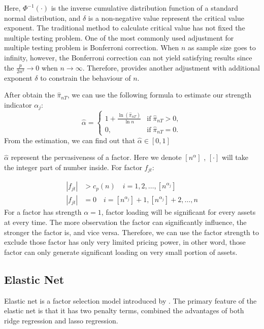 \documentclass[12pt]{article}
\begin{document}
Here, $\Phi^{-1}(\cdot)$ is the inverse cumulative distribution function of a standard normal distribution, and $\delta$ is a non-negative value represent the critical value exponent. 
The traditional method to calculate critical value has not fixed the multiple testing problem. 
One of the most commonly used adjustment for multiple testing problem is Bonferroni correction. 
When $n$ as sample size goes to infinity, however, the Bonferroni correction can not yield satisfying results since the $\frac{p}{2n^{\delta}} \to 0$ when $n \to \infty$. 
Therefore,  provides another adjustment with additional exponent $\delta$ to constrain the behaviour of $n$.

After obtain the $\hat{\pi}_{nT}$, we can use the following formula to estimate our strength indicator $\alpha_j$:
\[ \hat{\alpha} = \begin{cases}
1+\frac{\ln(\hat{\pi}_{nT})}{\ln n} & \text{if}\; \hat{\pi}_{nT} > 0,\\
0, & \text{if}\; \hat{\pi}_{nT} = 0.
\end{cases} \]
From the estimation, we can find out that $\hat{\alpha} \in [0,1]$

$\hat{\alpha}$ represent the pervasiveness of a factor. 
Here we denote $[n^{\alpha}]$ , $[\cdot]$ will take the integer part of number inside. 
For factor $f_{jt}$:

\begin{align*}
|f_{jt}| &> c_p(n)\quad i = 1, 2,  \dots, [n^{\alpha_j}]\\
|f_{jt}| &= 0 \quad i = [n^{\alpha_j}] + 1, [n^{\alpha_j}] +2 ,\dots, n
\end{align*}
For a factor has strength $\alpha = 1$,  factor loading will be significant for every assets at every time. 
The more observation the factor can significantly influence, the stronger the factor is, and vice versa.
Therefore, we can use the factor strength to exclude those factor has only very limited pricing power, in other word, those factor can only generate significant loading on very small portion of assets. 

\subsection{Elastic Net}

Elastic net  is a factor selection model introduced by .
The primary feature of the elastic net is that it has two penalty terms, combined the advantages of both ridge regression and lasso regression.
\end{document}
